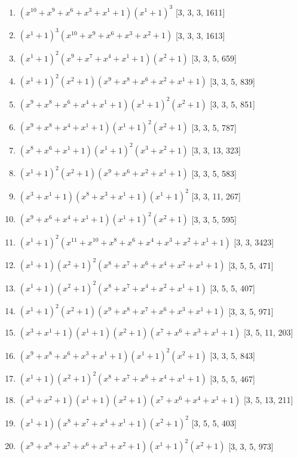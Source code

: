 \documentclass[10pt,twocolumn]{article}
\begin{document}
\begin{enumerate}
\item $(x^{10} + x^{9} + x^{6} + x^{3} + x^{1} + 1)(x^{1} + 1)^{3}$  [3, 3, 3, 1611]
\item $(x^{1} + 1)^{3}(x^{10} + x^{9} + x^{6} + x^{3} + x^{2} + 1)$  [3, 3, 3, 1613]
\item $(x^{1} + 1)^{2}(x^{9} + x^{7} + x^{4} + x^{1} + 1)(x^{2} + 1)$  [3, 3, 5, 659]
\item $(x^{1} + 1)^{2}(x^{2} + 1)(x^{9} + x^{8} + x^{6} + x^{2} + x^{1} + 1)$  [3, 3, 5, 839]
\item $(x^{9} + x^{8} + x^{6} + x^{4} + x^{1} + 1)(x^{1} + 1)^{2}(x^{2} + 1)$  [3, 3, 5, 851]
\item $(x^{9} + x^{8} + x^{4} + x^{1} + 1)(x^{1} + 1)^{2}(x^{2} + 1)$  [3, 3, 5, 787]
\item $(x^{8} + x^{6} + x^{1} + 1)(x^{1} + 1)^{2}(x^{3} + x^{2} + 1)$  [3, 3, 13, 323]
\item $(x^{1} + 1)^{2}(x^{2} + 1)(x^{9} + x^{6} + x^{2} + x^{1} + 1)$  [3, 3, 5, 583]
\item $(x^{3} + x^{1} + 1)(x^{8} + x^{3} + x^{1} + 1)(x^{1} + 1)^{2}$  [3, 3, 11, 267]
\item $(x^{9} + x^{6} + x^{4} + x^{1} + 1)(x^{1} + 1)^{2}(x^{2} + 1)$  [3, 3, 5, 595]
\item $(x^{1} + 1)^{2}(x^{11} + x^{10} + x^{8} + x^{6} + x^{4} + x^{3} + x^{2} + x^{1} + 1)$  [3, 3, 3423]
\item $(x^{1} + 1)(x^{2} + 1)^{2}(x^{8} + x^{7} + x^{6} + x^{4} + x^{2} + x^{1} + 1)$  [3, 5, 5, 471]
\item $(x^{1} + 1)(x^{2} + 1)^{2}(x^{8} + x^{7} + x^{4} + x^{2} + x^{1} + 1)$  [3, 5, 5, 407]
\item $(x^{1} + 1)^{2}(x^{2} + 1)(x^{9} + x^{8} + x^{7} + x^{6} + x^{3} + x^{1} + 1)$  [3, 3, 5, 971]
\item $(x^{3} + x^{1} + 1)(x^{1} + 1)(x^{2} + 1)(x^{7} + x^{6} + x^{3} + x^{1} + 1)$  [3, 5, 11, 203]
\item $(x^{9} + x^{8} + x^{6} + x^{3} + x^{1} + 1)(x^{1} + 1)^{2}(x^{2} + 1)$  [3, 3, 5, 843]
\item $(x^{1} + 1)(x^{2} + 1)^{2}(x^{8} + x^{7} + x^{6} + x^{4} + x^{1} + 1)$  [3, 5, 5, 467]
\item $(x^{3} + x^{2} + 1)(x^{1} + 1)(x^{2} + 1)(x^{7} + x^{6} + x^{4} + x^{1} + 1)$  [3, 5, 13, 211]
\item $(x^{1} + 1)(x^{8} + x^{7} + x^{4} + x^{1} + 1)(x^{2} + 1)^{2}$  [3, 5, 5, 403]
\item $(x^{9} + x^{8} + x^{7} + x^{6} + x^{3} + x^{2} + 1)(x^{1} + 1)^{2}(x^{2} + 1)$  [3, 3, 5, 973]

\end{enumerate}
\end{document}
